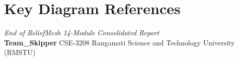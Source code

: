 \documentclass[11pt,a4paper]{report}
\begin{document}
\chapter{Key Diagram References}
\label{app:c}


\clearpage
\thispagestyle{plain}
\begin{center}
\vspace*{\fill}
\textit{End of ReliefMesh 14-Module Consolidated Report}\\[4pt]
\textbf{Team\_Skipper} \textbar{} CSE-3208 \textbar{} Rangamati Science and Technology University (RMSTU)
\vspace*{\fill}
\end{center}
\end{document}
